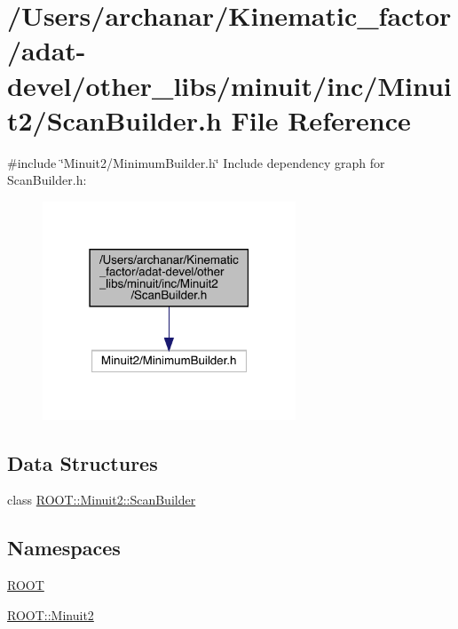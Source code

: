 \hypertarget{adat-devel_2other__libs_2minuit_2inc_2Minuit2_2ScanBuilder_8h}{}\section{/\+Users/archanar/\+Kinematic\+\_\+factor/adat-\/devel/other\+\_\+libs/minuit/inc/\+Minuit2/\+Scan\+Builder.h File Reference}
\label{adat-devel_2other__libs_2minuit_2inc_2Minuit2_2ScanBuilder_8h}
{\ttfamily \#include \char`\"{}Minuit2/\+Minimum\+Builder.\+h\char`\"{}}\newline
Include dependency graph for Scan\+Builder.\+h\+:
\nopagebreak
\begin{figure}[H]
\begin{center}
\leavevmode
\includegraphics[width=214pt]{de/d65/adat-devel_2other__libs_2minuit_2inc_2Minuit2_2ScanBuilder_8h__incl}
\end{center}
\end{figure}
\subsection*{Data Structures}
\begin{DoxyCompactItemize}
\item 
class \mbox{\hyperlink{classROOT_1_1Minuit2_1_1ScanBuilder}{R\+O\+O\+T\+::\+Minuit2\+::\+Scan\+Builder}}
\end{DoxyCompactItemize}
\subsection*{Namespaces}
\begin{DoxyCompactItemize}
\item 
 \mbox{\hyperlink{namespaceROOT}{R\+O\+OT}}
\item 
 \mbox{\hyperlink{namespaceROOT_1_1Minuit2}{R\+O\+O\+T\+::\+Minuit2}}
\end{DoxyCompactItemize}
